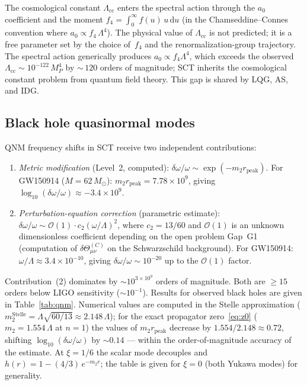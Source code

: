 \documentclass[12pt,a4paper]{article}
\theoremstyle{plain}
\theoremstyle{definition}
\theoremstyle{remark}
\newcommand{\dd}{\mathrm{d}}
\newcommand{\order}{\mathcal{O}}
\begin{document}
The cosmological constant $\Lambda_{\mathrm{cc}}$ enters the
spectral action through the $a_0$ coefficient and the moment
$f_4 = \int_0^\infty f(u)\, u\, \dd u$ (in the Chamseddine--Connes
convention where $a_0 \propto f_4\, \Lambda^4$).  The physical
value of $\Lambda_{\mathrm{cc}}$ is not predicted; it is a free
parameter set by the choice of~$f_4$ and the
renormalization-group trajectory.  The spectral action
generically produces $a_0 \propto f_4 \Lambda^4$, which exceeds
the observed $\Lambda_{\mathrm{cc}} \sim 10^{-122}\, M_P^4$ by
${\sim}\,120$ orders of magnitude; SCT inherits the
cosmological constant problem from quantum field theory.  This
gap is shared by LQG, AS, and IDG.

\subsection{Black hole quasinormal modes}
\label{sec:qnm}

QNM frequency shifts in SCT receive two independent contributions:
\begin{enumerate}
\item \emph{Metric modification} (Level~2, computed):
  $\delta\omega/\omega \sim \exp(-m_2 r_{\mathrm{peak}})$.
  For GW150914 ($M = 62\,M_\odot$): $m_2 r_{\mathrm{peak}} = 7.78 \times 10^9$,
  giving $\log_{10}(\delta\omega/\omega) \approx -3.4 \times 10^9$.
\item \emph{Perturbation-equation correction} (parametric estimate):
  $\delta\omega/\omega \sim \order(1) \cdot c_2(\omega/\Lambda)^2$,
  where $c_2 = 13/60$ and $\order(1)$ is an unknown dimensionless
  coefficient depending on the open problem Gap~G1 (computation of
  $\delta\Theta^{(C)}_{\mu\nu}$ on the Schwarzschild background).
  For GW150914: $\omega/\Lambda \approx 3.4 \times 10^{-10}$, giving
  $\delta\omega/\omega \sim 10^{-20}$ up to the $\order(1)$ factor.
\end{enumerate}
Contribution~(2) dominates by $\sim 10^{3 \times 10^9}$ orders of magnitude.
Both are $\geq 15$ orders below LIGO sensitivity ($\sim 10^{-1}$).
Results for observed black holes are given in Table~\ref{tab:qnm}.
Numerical values are computed in the Stelle approximation
($m_2^{\mathrm{Stelle}} = \Lambda\sqrt{60/13} \approx 2.148\,\Lambda$);
for the exact propagator zero~\eqref{eq:z0}
($m_2 = 1.554\,\Lambda$ at $n=1$) the values of
$m_2 r_{\mathrm{peak}}$ decrease by $1.554/2.148 \approx 0.72$,
shifting $\log_{10}(\delta\omega/\omega)$ by $\sim 0.14$ ---
within the order-of-magnitude accuracy of the estimate.
At $\xi = 1/6$ the scalar mode decouples and
$h(r) = 1 - (4/3)\,e^{-m_2 r}$; the table is given for
$\xi = 0$ (both Yukawa modes) for generality.
\end{document}
